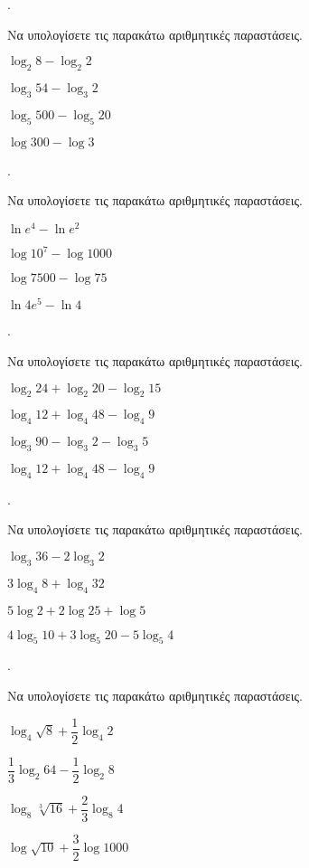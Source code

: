 \documentclass[11pt,a4paper,twocolumn]{article}
\newcounter{askhsh}
\newcommand{\askhsh}{{\large\theaskhsh.}\ \addtocounter{askhsh}{1}}
\begin{document}
\askhsh Να υπολογίσετε τις παρακάτω αριθμητικές παραστάσεις.
\begin{multicols}{2}
\begin{alist}
\item $ \log_{2}{8}-\log_{2}{2} $
\item $ \log_{3}{54}-\log_{3}{2} $
\item $ \log_{5}{500}-\log_{5}{20} $
\item $ \log{300}-\log{3} $
\end{alist}
\end{multicols}
\askhsh Να υπολογίσετε τις παρακάτω αριθμητικές παραστάσεις.
\begin{multicols}{2}
\begin{alist}
\item $ \ln{e^4}-\ln{e^2} $
\item $ \log{10^7}-\log{1000} $
\item $ \log{7500}-\log{75} $
\item $ \ln{4e^5}-\ln{4} $
\end{alist}
\end{multicols}
\askhsh Να υπολογίσετε τις παρακάτω αριθμητικές παραστάσεις.
\begin{alist}
\item $ \log_{2}{24}+\log_{2}{20}-\log_{2}{15} $
\item $ \log_{4}{12}+\log_{4}{48}-\log_{4}{9} $
\item $ \log_{3}{90}-\log_{3}{2}-\log_{3}{5} $
\item $ \log_{4}{12}+\log_{4}{48}-\log_{4}{9} $
\end{alist}
\askhsh Να υπολογίσετε τις παρακάτω αριθμητικές παραστάσεις.
\begin{alist}
\item $ \log_{3}{36}-2\log_{3}{2} $
\item $ 3\log_{4}{8}+\log_{4}{32} $
\item $ 5\log{2}+2\log{25}+\log{5} $
\item $ 4\log_{5}{10}+3\log_{5}{20}-5\log_{5}{4} $
\end{alist}
\askhsh Να υπολογίσετε τις παρακάτω αριθμητικές παραστάσεις.
\begin{alist}
\item $ \log_{4}{\sqrt{8}}+\dfrac{1}{2}\log_{4}{2} $
\item $ \dfrac{1}{3}\log_{2}{64}-
\dfrac{1}{2}\log_{2}{8} $
\item $ \log_{8}{\sqrt[3]{16}}+\dfrac{2}{3}\log_{8}{4} $
\item $ \log{\sqrt{10}}+\dfrac{3}{2}\log{1000} $
\end{alist}
\end{document}
